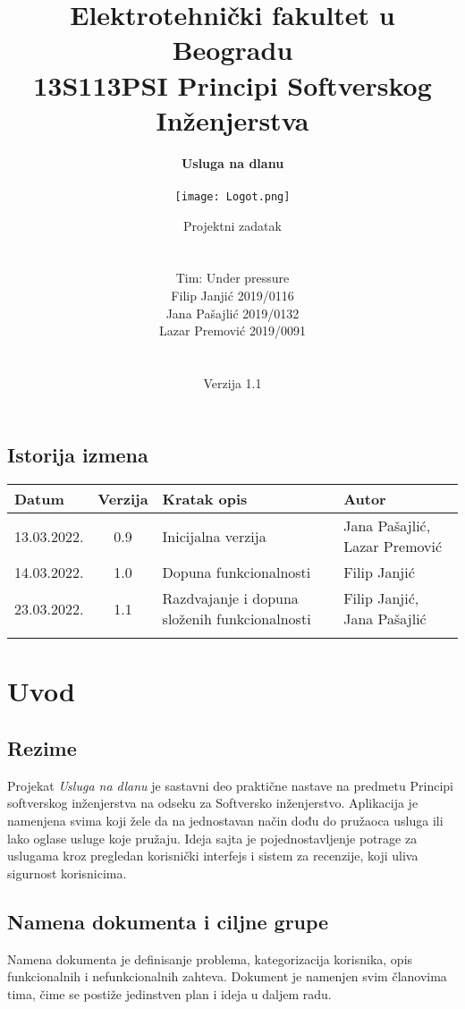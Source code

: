 \documentclass[a4paper,12pt]{report}
\title{\Large Elektrotehnički fakultet u Beogradu \\ 13S113PSI Principi Softverskog Inženjerstva}
\author{\Huge \textbf{Usluga na dlanu}\\ \ \\\texttt{[image: Logot.png]}\\}
\date{\Large Projektni zadatak \\ \ \\ \ \\ \Large   Tim: Under pressure \\ Filip Janjić 2019/0116 \\ Jana Pašajlić 2019/0132 \\ Lazar Premović 2019/0091  \\ \  \\ \  \\\large Verzija 1.1}
\begin{document}
\maketitle

\begin{center}
\section*{Istorija izmena}
\begin{tabular}{ |l|c|p{5.5cm}|l|}
\hline
\textbf{Datum} & \textbf{Verzija} & \textbf{Kratak opis} & \textbf{Autor} \\ 
\hline
 13.03.2022. & 0.9  & Inicijalna verzija & Jana Pašajlić, Lazar Premović \\
 \hline
 14.03.2022. & 1.0 & Dopuna funkcionalnosti & Filip Janjić \\
 \hline
 23.03.2022. & 1.1 & Razdvajanje i dopuna složenih funkcionalnosti & Filip Janjić, Jana Pašajlić \\
 \hline
 &  &  &  \\
 \hline
\end{tabular}
\end{center}
\newpage

\tableofcontents

\newpage
\section{Uvod}
\subsection{Rezime}
Projekat \textit{Usluga na dlanu} je sastavni deo praktične nastave na predmetu Principi softverskog inženjerstva na odseku za Softversko inženjerstvo. Aplikacija je namenjena svima koji žele da na jednostavan način dođu do pružaoca usluga ili lako oglase usluge koje pružaju. Ideja sajta je pojednostavljenje potrage za uslugama kroz pregledan korisnički interfejs i sistem za recenzije, koji uliva sigurnost korisnicima.

\subsection{Namena dokumenta i ciljne grupe}
Namena dokumenta je definisanje problema, kategorizacija korisnika, opis funkcionalnih i nefunkcionalnih zahteva. Dokument je namenjen svim članovima tima, čime se postiže jedinstven plan i ideja u daljem radu.
\end{document}

